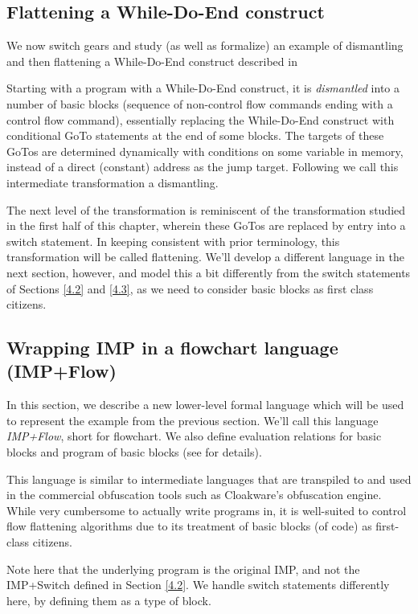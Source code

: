 \documentclass[compsoc,conference,a4paper,10pt,times]{IEEEtran}
\begin{document}
\subsection{Flattening a While-Do-End construct}\label{4.4}
We now switch gears and study (as well as formalize) an example of dismantling and then flattening a While-Do-End construct described in \cite{Wang}

Starting with a program with a While-Do-End construct, it is \emph{dismantled} into a number of basic blocks (sequence of non-control flow commands ending with a control flow command), essentially replacing the While-Do-End construct with conditional GoTo statements at the end of some blocks.  The targets of these GoTos are determined dynamically with conditions on some variable in memory, instead of a direct (constant) address as the jump target. Following \cite{Wang} we call this intermediate transformation a dismantling.
\par The next level of the transformation is reminiscent of the transformation studied in the first half of this chapter, wherein these GoTos are replaced by entry into a switch statement.  In keeping consistent with prior terminology, this transformation will be called flattening.  We'll develop a different language in the next section, however, and model this a bit differently from the switch statements of Sections \ref{4.2} and \ref{4.3}, as we need to consider basic blocks as first class citizens.

\subsection{Wrapping IMP in a flowchart language (IMP+Flow)}

In this section, we describe a new lower-level formal language which will be used to represent the example from the previous section.  We'll call this language \emph{IMP+Flow}, short for flowchart. We also define evaluation relations for basic blocks and program of basic blocks (see \cite{Weyun} for details).

\par This language is similar to intermediate languages that are transpiled to and used in the commercial obfuscation tools such as Cloakware's obfuscation engine. While very cumbersome to actually write programs in, it is well-suited to control flow flattening algorithms due to its treatment of basic blocks (of code) as first-class citizens.

\par Note here that the underlying program is the original IMP, and not the IMP+Switch defined in Section \ref{4.2}.  We handle switch statements differently here, by defining them as a type of block.
\end{document}
